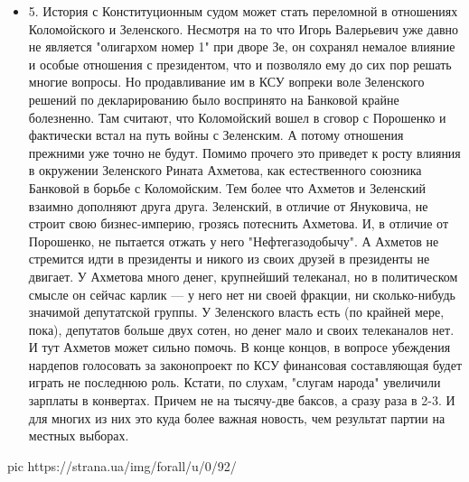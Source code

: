 \begin{itemize}
\item 5. История с Конституционным судом может стать переломной в отношениях
				Коломойского и Зеленского. Несмотря на то что Игорь Валерьевич уже
				давно не является "олигархом номер 1" при дворе Зе, он сохранял немалое
				влияние и особые отношения с президентом, что и позволяло ему до сих
				пор решать многие вопросы.  Но продавливание им в КСУ вопреки воле
				Зеленского решений по декларированию было воспринято на Банковой крайне
				болезненно. Там считают, что Коломойский вошел в сговор с Порошенко и
				фактически встал на путь войны с Зеленским. А потому отношения прежними
				уже точно не будут. Помимо прочего это приведет к росту влияния в
				окружении Зеленского Рината Ахметова, как естественного союзника
				Банковой в борьбе с Коломойским. Тем более что Ахметов и Зеленский
				взаимно дополняют друга друга. Зеленский, в отличие от Януковича, не
				строит свою бизнес-империю, грозясь потеснить Ахметова. И, в отличие от
				Порошенко, не пытается отжать у него "Нефтегазодобычу". А Ахметов не
				стремится идти в президенты и никого из своих друзей в президенты не
				двигает. У Ахметова много денег, крупнейший телеканал, но в
				политическом смысле он сейчас карлик --- у него нет ни своей фракции, ни
				сколько-нибудь значимой депутатской группы. У Зеленского власть есть
				(по крайней мере, пока), депутатов больше двух сотен, но денег мало и
				своих телеканалов нет. И тут Ахметов может сильно помочь. В конце
				концов, в вопросе убеждения нардепов голосовать за законопроект по КСУ
				финансовая составляющая будет играть не последнюю роль. Кстати, по
				слухам, "слугам народа" увеличили зарплаты в конвертах. Причем не на
				тысячу-две баксов, а сразу раза в 2-3. И для многих из них это куда
				более важная новость, чем результат партии на местных выборах.
\end{itemize}

\ifcmt
pic https://strana.ua/img/forall/u/0/92/%
\fi

